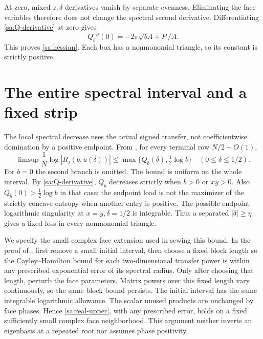 \documentclass[11pt]{article}
\numberwithin{equation}{section}
\theoremstyle{definition}\newtheorem{definition}[theorem]{Definition}
\theoremstyle{remark}\newtheorem{remark}[theorem]{Remark}
\begin{document}
At zero, mixed $z,\delta$ derivatives vanish by separate evenness.
Eliminating the face variables therefore does not change the
spectral second derivative. Differentiating \eqref{sa:Q-derivative}
at zero gives
\[
 Q_b''(0)=-2\pi\sqrt{bA+P}/A.
\]
This proves \eqref{sa:hessian}. Each box has a nonmonomial triangle,
so its constant is strictly positive.

\section{The entire spectral interval and a fixed strip}\label{sa:spectral}
The local spectral decrease uses the actual signed transfer, not
coefficientwise domination by a positive endpoint. From
\cite[Lemmas 4.1 and 5.2]{Local}, for every terminal row $N/2+O(1)$,
\begin{equation}\label{sa:real-upper}
 \limsup\frac1N\log|R_j(b,u(\delta))|
                  \le\max\{Q_b(\delta),\tfrac12\log b\}
                       \quad(0\le\delta\le1/2).
\end{equation}
For $b=0$ the second branch is omitted. The bound is uniform on the
whole interval. By \eqref{sa:Q-derivative}, $Q_b$ decreases strictly
when $b>0$ or $xy>0$. Also $Q_b(0)>\tfrac12\log b$ in that case:
the endpoint load is not the maximizer of the strictly concave entropy
when another entry is positive. The possible endpoint logarithmic
singularity at $x=y,\delta=1/2$ is integrable. Thus a separated
$|\delta|\ge\eta$ gives a fixed loss in every nonmonomial triangle.

We specify the small complex face extension used in sewing this bound.
In the proof of \cite[Lemma 4.1]{Local}, first remove a small initial
interval, then choose a fixed block length so the Cayley--Hamilton
bound for each two-dimensional transfer power is within any prescribed
exponential error of its spectral radius. Only after choosing that
length, perturb the face parameters. Matrix powers over this fixed
length vary continuously, so the same block bound persists. The
initial interval has the same integrable logarithmic allowance.
The scalar unused products are unchanged by face phases. Hence
\eqref{sa:real-upper}, with any prescribed error, holds on a fixed
sufficiently small complex face neighborhood. This argument neither
inverts an eigenbasis at a repeated root nor assumes phase positivity.
\end{document}
